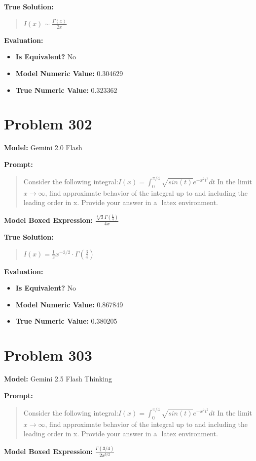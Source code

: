 \documentclass{article}
\begin{document}
{\textbf{True Solution:}
\begin{quote}
$I(x)\sim \frac{\Gamma(x)}{2x}$
\end{quote}

\textbf{Evaluation:}
\begin{itemize}
\item \textbf{Is Equivalent?} No
\item \textbf{Model Numeric Value:} 0.304629
\item \textbf{True Numeric Value:} 0.323362
\end{itemize}
\vspace{1cm}
\section*{Problem 302}
\textbf{Model:} Gemini 2.0 Flash

\textbf{Prompt:}
\begin{quote}
Consider the following integral:$I(x) = \int_0^{π/4}\sqrt{sin (t)}e^{-x^2t^2}dt$ In the limit$x \rightarrow \infty$, find approximate behavior of the integral up to and including the leading order in x. Provide your answer in a $\boxed{}$ latex environment.
\end{quote}
\textbf{Model Boxed Expression:} $\frac{\sqrt[4]{3} \Gamma(\frac{1}{4})}{4x}$

\textbf{True Solution:}
\begin{quote}
$I(x) = \frac{1}{2}x^{-3/2}\cdot\Gamma(\frac{3}{4})$
\end{quote}

\textbf{Evaluation:}
\begin{itemize}
\item \textbf{Is Equivalent?} No
\item \textbf{Model Numeric Value:} 0.867849
\item \textbf{True Numeric Value:} 0.380205
\end{itemize}
\vspace{1cm}
\section*{Problem 303}
\textbf{Model:} Gemini 2.5 Flash Thinking

\textbf{Prompt:}
\begin{quote}
Consider the following integral:$I(x) = \int_0^{π/4}\sqrt{sin (t)}e^{-x^2t^2}dt$ In the limit$x \rightarrow \infty$, find approximate behavior of the integral up to and including the leading order in x. Provide your answer in a $\boxed{}$ latex environment.
\end{quote}
\textbf{Model Boxed Expression:} $\frac{\Gamma(3/4)}{2x^{3/2}}$

}
\end{document}
